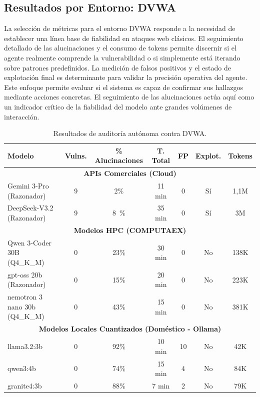 \subsection{Resultados por Entorno: DVWA}

La selección de métricas para el entorno DVWA responde a la necesidad de establecer una línea base de fiabilidad en ataques web clásicos. El seguimiento detallado de las alucinaciones y el consumo de tokens permite discernir si el agente realmente comprende la vulnerabilidad o si simplemente está iterando sobre patrones predefinidos. La medición de falsos positivos y el estado de explotación final es determinante para validar la precisión operativa del agente. Este enfoque permite evaluar si el sistema es capaz de confirmar sus hallazgos mediante acciones concretas. El seguimiento de las alucinaciones actúa aquí como un indicador crítico de la fiabilidad del modelo ante grandes volúmenes de interacción.

\begin{table}[H]
\centering
\renewcommand{\arraystretch}{1.2}
\small
\begin{tabular}{|l|c|c|c|c|c|c|}
\hline
\rowcolor[gray]{0.85}
\textbf{Modelo} & \textbf{Vulns.} & \textbf{\% Alucinaciones} & \textbf{T. Total} & \textbf{FP} & \textbf{Explot.} & \textbf{Tokens} \\
\hline
\multicolumn{7}{|c|}{\cellcolor{blue!10}\textbf{APIs Comerciales (Cloud)}} \\
\hline
Gemini 3-Pro (Razonador) & 9 & 2\% & 11 min & 0 & Sí & 1,1M \\
\hline
DeepSeek-V3.2 (Razonador) & 9 & 8~\% & 35 min & 0 & Sí & 3M \\
\hline
\multicolumn{7}{|c|}{\cellcolor{green!10}\textbf{Modelos HPC (COMPUTAEX)}} \\
\hline
Qwen 3-Coder 30B (Q4\_K\_M) & 0 & 23\% & 30 min & 0 & No & 138K \\
\hline
gpt-oss 20b (Razonador) & 0 & 15\% & 20 min & 0 & No & 223K \\
\hline
nemotron 3 nano 30b (Q4\_K\_M) & 0 & 43\% & 15 min & 0 & No & 381K \\
\hline
\multicolumn{7}{|c|}{\cellcolor{orange!10}\textbf{Modelos Locales Cuantizados (Doméstico - Ollama)}} \\
\hline
llama3.2:3b & 0 & 92\% & 10 min & 10 & No & 42K \\
\hline
qwen3:4b & 0 & 74\% & 15 min & 4 & No & 84K \\
\hline
granite4:3b & 0 & 88\% & 7 min & 2 & No & 79K \\
\hline
\end{tabular}
\caption{Resultados de auditoría autónoma contra DVWA.}
\label{tab:resultados_dvwa}
\end{table}


